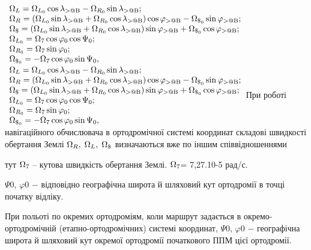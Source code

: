 $\begin{array}{l} {\Omega_{L} =\Omega_{L_{0} } \cos 
\lambda_{{\rm >@B}} -\Omega_{R_{0} } \sin \lambda_{{\rm >@B}} ;} \\ {\Omega_{R} 
=(\Omega_{L_{0} } \sin \lambda_{{\rm >@B}} +\Omega_{R_{0} } \cos \lambda_{{\rm 
>@B}} )\cos \varphi_{{\rm >@B}} -\Omega_{\$_{0} } \sin \varphi_{{\rm >@B}} ;} 
\\ {\Omega_{\$ } =(\Omega_{L_{0} } \sin \lambda_{{\rm >@B}} +\Omega_{R_{0} } 
\cos \lambda_{{\rm >@B}} )\sin \varphi_{{\rm >@B}} +\Omega_{\$_{0} } \cos \varphi 
_{{\rm >@B}} ;} \\ {\Omega_{L_{0} } =\Omega_{{\rm 7}} \cos \varphi_{0} \cos \Psi 
_{0} ;} \\ {\Omega_{R_{0} } =\Omega_{{\rm 7}} \sin \varphi_{0} ;} \\ {\Omega_{
\$_{0} } =-\Omega_{{\rm 7}} \cos \varphi_{0} \sin \Psi_{0} ,} \end{array}$$\begin{array}{l} 
{\Omega_{L} =\Omega_{L_{0} } \cos \lambda_{{\rm >@B}} -\Omega_{R_{0} } \sin \lambda 
_{{\rm >@B}} ;} \\ {\Omega_{R} =(\Omega_{L_{0} } \sin \lambda_{{\rm >@B}} +\Omega 
_{R_{0} } \cos \lambda_{{\rm >@B}} )\cos \varphi_{{\rm >@B}} -\Omega_{\$_{0} 
} \sin \varphi_{{\rm >@B}} ;} \\ {\Omega_{\$ } =(\Omega_{L_{0} } \sin \lambda 
_{{\rm >@B}} +\Omega_{R_{0} } \cos \lambda_{{\rm >@B}} )\sin \varphi_{{\rm >@B}} 
+\Omega_{\$_{0} } \cos \varphi_{{\rm >@B}} ;} \\ {\Omega_{L_{0} } =\Omega_{{
\rm 7}} \cos \varphi_{0} \cos \Psi_{0} ;} \\ {\Omega_{R_{0} } =\Omega_{{\rm 7}} 
\sin \varphi_{0} ;} \\ {\Omega_{\$_{0} } =-\Omega_{{\rm 7}} \cos \varphi_{0} 
\sin \Psi_{0} ,} \end{array}$При роботі навігаційного обчислювача в ортодромічної 
системі координат складові швидкості обертання Землі $\Omega_{R} ,{\rm \; }\Omega 
_{L} ,{\rm \; }\Omega_{\$ } $ визначаються вже по іншим співвідношеннями

тут  $\Omega_{{\rm 7}} $ -- кутова швидкість обертання Землі. $\Omega_{{\rm 7}} $= 
7,27$.$10-5 рад/с.

$\Psi$0, $\varphi$0 $-$ відповідно географічна широта й шляховий кут ортодромії в 
точці початку відліку. 

При польоті по окремих ортодроміям, коли маршрут задається в окремо-ортодромічній 
(етапно-ортодромічних) системі координат, $\Psi$0, $\varphi$0 $-$ географічна широта 
й шляховий кут окремої ортодромії початкового ППМ цієї ортодромії.

